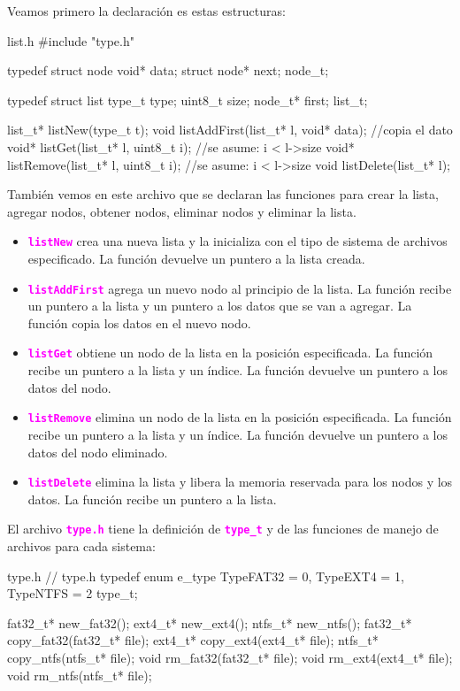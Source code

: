 \documentclass[]{scrartcl}
\newcommand{\hl}[1]{\textcolor{magenta}{\textbf{\texttt{#1}}}}
\begin{document}
Veamos primero la declaración es estas estructuras:

\begin{cbox}[]{list.h}
  #include "type.h"
  
  typedef struct node {
    void* data;
    struct node* next;
  } node_t;
  
  typedef struct list {
    type_t type;
    uint8_t size;
    node_t* first;
  } list_t;

  list_t* listNew(type_t t);
  void  listAddFirst(list_t* l, void* data); //copia el dato
  void* listGet(list_t* l, uint8_t i); //se asume: i < l->size
  void* listRemove(list_t* l, uint8_t i); //se asume: i < l->size
  void  listDelete(list_t* l);

\end{cbox}

También vemos en este archivo que se declaran las funciones para crear la lista, agregar nodos, obtener nodos, eliminar nodos y eliminar la lista.
\begin{itemize}
  \item \hl{listNew} crea una nueva lista y la inicializa con el tipo de sistema de archivos especificado. La función devuelve un puntero a la lista creada.
  \item \hl{listAddFirst} agrega un nuevo nodo al principio de la lista. La función recibe un puntero a la lista y un puntero a los datos que se van a agregar. La función copia los datos en el nuevo nodo.
  \item \hl{listGet} obtiene un nodo de la lista en la posición especificada. La función recibe un puntero a la lista y un índice. La función devuelve un puntero a los datos del nodo.
  \item \hl{listRemove} elimina un nodo de la lista en la posición especificada. La función recibe un puntero a la lista y un índice. La función devuelve un puntero a los datos del nodo eliminado.
  \item \hl{listDelete} elimina la lista y libera la memoria reservada para los nodos y los datos. La función recibe un puntero a la lista.
\end{itemize}

El archivo \hl{type.h} tiene la definición de \hl{type\_t} y de las funciones de manejo de archivos para cada sistema:

\begin{cbox}[]{type.h}
  // type.h
  typedef enum e_type {
    TypeFAT32 = 0,
    TypeEXT4 = 1,
    TypeNTFS = 2
  } type_t;

  fat32_t* new_fat32();
  ext4_t* new_ext4();
  ntfs_t* new_ntfs();          
  fat32_t* copy_fat32(fat32_t* file);
  ext4_t* copy_ext4(ext4_t* file);
  ntfs_t* copy_ntfs(ntfs_t* file);
  void rm_fat32(fat32_t* file);
  void rm_ext4(ext4_t* file);
  void rm_ntfs(ntfs_t* file);
\end{cbox}
\end{document}
